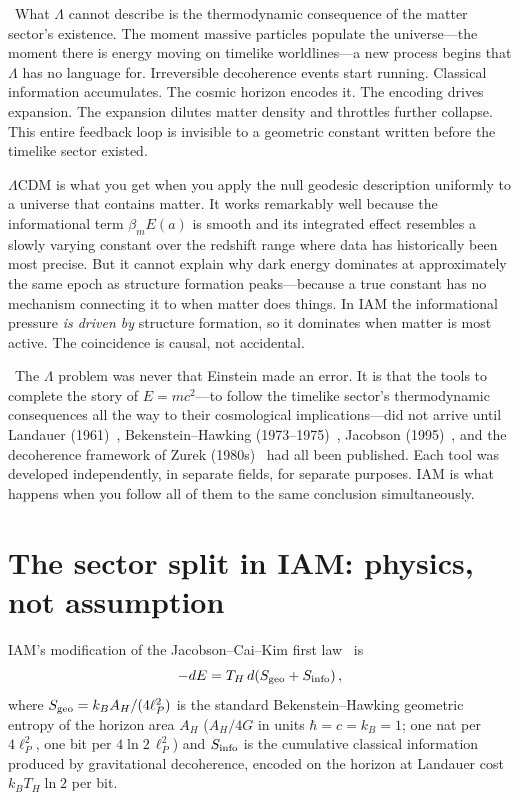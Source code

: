 \conjecture\ What $\Lambda$ cannot describe is the thermodynamic consequence of the matter sector's existence. The moment massive particles populate the
universe---the moment there is energy moving on timelike worldlines---a new process begins that $\Lambda$ has no language for. Irreversible decoherence
events start running. Classical information accumulates. The cosmic horizon encodes it. The encoding drives expansion. The expansion dilutes matter
density and throttles further collapse. This entire feedback loop is invisible to a geometric constant written before the timelike sector existed.

\begin{keybox}[title={$\Lambda$CDM and the record term}]
$\Lambda$CDM is what you get when you apply the null geodesic description uniformly to a universe that contains matter. It works remarkably well because
the informational term $\beta_mE(a)$ is smooth and its integrated effect resembles a slowly varying constant over the redshift range where data has
historically been most precise. But it cannot explain why dark energy dominates at approximately the same epoch as structure formation peaks---because a
true constant has no mechanism connecting it to when matter does things. In IAM the informational pressure \emph{is driven by} structure formation, so it
dominates when matter is most active. The coincidence is causal, not accidental. \conjecture
\end{keybox}

\interp\ The $\Lambda$ problem was never that Einstein made an error. It is that the tools to complete the story of $E=mc^2$---to follow the timelike
sector's thermodynamic consequences all the way to their cosmological implications---did not arrive until Landauer (1961)~\cite{Landauer1961},
Bekenstein--Hawking (1973--1975)~\cite{Bekenstein1973,Hawking1975}, Jacobson (1995)~\cite{Jacobson1995}, and the decoherence framework of Zurek
(1980s)~\cite{Zurek1981,Zurek1982} had all been published. Each tool was developed independently, in separate fields, for separate purposes. IAM is
what happens when you follow all of them to the same conclusion simultaneously.

\section{The sector split in IAM: physics, not assumption}\label{sec:dsn_firstlaw}
IAM's modification of the Jacobson--Cai--Kim first law~\cite{Jacobson1995,CaiKim2005} is
\begin{equation}
-dE=T_H\,d\!\left(S_{\rm geo}+S_{\rm info}\right), \label{eq:dsn_firstlaw}
\end{equation}
where $S_{\rm geo}=k_BA_H/(4\ell_P^2)$ is the standard Bekenstein--Hawking geometric entropy of the horizon area $A_H$ ($A_H/4G$ in units
$\hbar=c=k_B=1$; one nat per $4\ell_P^2$, one bit per $4\ln2\,\ell_P^2$) and $S_{\rm info}$ is the cumulative classical information produced by
gravitational decoherence, encoded on the horizon at Landauer cost $k_BT_H\ln2$ per bit.

